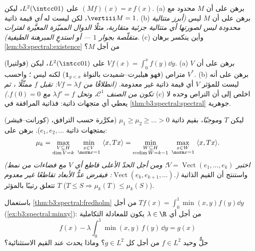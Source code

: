 \begin{exercise}[$\star\star$]\label{exo:b3:spectral:6}
على $L^2(\intcc01)$، ليكن $(Mf)(x) = x\,f(x)$.
(a) برهن على أن $M$ محدود  مع $\vertiii M =
1$، لكن ليست
له \emph{أي} قيمة ذاتية.
(b) برهن على أن $M$ ليس  \emph{(أبرز متتالية محدودة
ليس لصورتها أي متتالية جزئية متقاربة، مثلًا الدوال المميّزة
المعيَّرة لفترات متقلّصة بجوار $1$ --- أو استدعِ المبرهنة
الطيفية)}.
(c) وأين ينكسر برهان \cref{lem:b3:spectral:existence} من أجل $M$؟
\end{exercise}

\begin{exercise}[$\star\star$]\label{exo:b3:spectral:7}
(فولتيرا) على $L^2(\intcc01)$، ليكن $Vf(x) = \int_0^xf(y)\dd
y$.
(a) برهن على أن $V$ متراص (فهو هيلبرت--شميدت بالنواة $\mathbf
1_{y < x}$)
لكنه ليس ؛ واحسب $V^*$.
(b) برهن على أنه ليست للمؤثر $V$ أي قيمة ذاتية غير معدومة.
\emph{(انطلاقًا من $Vf =
\lambda f$: تقبل $f$ ممثّلًا ، ثم تكون
من الصنف $\mathcal C^1$، وتحل $\lambda f' = f$ مع
$f(0) = 0$.)}
(c) اخلص إلى أن التراص وحده لا يعطي أي متجهات ذاتية: فذاتية
المرافقة في \cref{thm:b3:spectral:spectral} جوهرية.
\end{exercise}

\begin{exercise}[$\star\star\star$]\label{exo:b3:spectral:8}
(كورانت--فيشر) ليكن $T$   و\emph{موجبًا}،
بقيم ذاتية $\mu_1 \geq \mu_2 \geq \dots
> 0$ (مكرَّرة حسب الترافق، بمتجهات ذاتية
$e_1, e_2,
\dots$). برهن على:
\[
\mu_{k} = \max_{\substack{V \subseteq H \\ \dim V = k}}\
\min_{\substack{x \in V\\ \norm x = 1}}\ \langle x, Tx\rangle
= \min_{\substack{W \subseteq H\\ \operatorname{codim}W =
k-1}}\ \max_{\substack{x\in W\\ \norm x = 1}}\ \langle x,
Tx\rangle .
\]
\emph{(اختبر $V = \operatorname{Vect}(e_1,\dots,e_k)$؛ ومن أجل الحدّ الأعلى قاطع أي $V$ مع
فضاءات من نمط $\operatorname{Vect}(e_k, e_{k+1}, \dots)$: فيفرض عدُّ الأبعاد تقاطعًا غير معدوم.)}
واستنتج أن القيم الذاتية تتعلق رتيبًا بالمؤثر $T$ ($T \leq S
\Rightarrow \mu_k(T) \leq \mu_k(S)$).
\end{exercise}

\begin{exercise}[$\star\star$]\label{exo:b3:spectral:9}
باستعمال \cref{thm:b3:spectral:fredholm} من أجل $Tf(x) =
\int_0^1\min(x,y)f(y)\dd y$ (\cref{ex:b3:spectral:minxy}): من أجل أي
$\lambda \in \R$ يكون للمعادلة التكاملية
\[
f(x) - \lambda\int_0^1\min(x,y)\,f(y)\,\dd y = g(x)
\]
حلٌّ وحيد $f \in L^2$ من أجل كل $g \in L^2$؟ وماذا يحدث عند
القيم الاستثنائية؟
\end{exercise}

